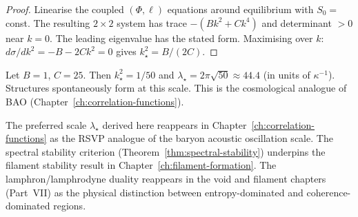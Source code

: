 \begin{proof}
  Linearise the coupled $(\Phi, \ell)$ equations around
  equilibrium with $S_0 = $ const.
  The resulting $2\times 2$ system has trace $-(Bk^2 + Ck^4)$
  and determinant $> 0$ near $k = 0$.
  The leading eigenvalue has the stated form.
  Maximising over $k$: $d\sigma/dk^2 = -B - 2Ck^2 = 0$
  gives $k_\star^2 = B/(2C)$.
\end{proof}

\begin{WorkedExample}
  Let $B = 1$, $C = 25$.
  Then $k_\star^2 = 1/50$ and
  $\lambda_\star = 2\pi\sqrt{50} \approx 44.4$ (in units of $\kappa^{-1}$).
  Structures spontaneously form at this scale.
  This is the cosmological analogue of BAO
  (Chapter~\ref{ch:correlation-functions}).
\end{WorkedExample}

\begin{ChapterConnection}
  The preferred scale $\lambda_\star$ derived here reappears
  in Chapter~\ref{ch:correlation-functions} as the RSVP
  analogue of the baryon acoustic oscillation scale.
  The spectral stability criterion (Theorem~\ref{thm:spectral-stability})
  underpins the filament stability result in
  Chapter~\ref{ch:filament-formation}.
  The lamphron/lamphrodyne duality reappears in the void and
  filament chapters (Part~VII) as the physical distinction
  between entropy-dominated and coherence-dominated regions.
\end{ChapterConnection}

\begin{ProblemSet}
\end{ProblemSet}

